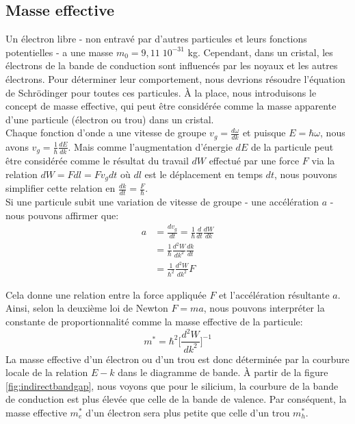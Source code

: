 \subsection{Masse effective}
Un électron libre - non entravé par d'autres particules et leurs fonctions potentielles - a une masse $m_0 = 9,11 \; 10^{-31}$ kg. Cependant, dans un cristal, les électrons de la bande de conduction sont influencés par les noyaux et les autres électrons. Pour déterminer leur comportement, nous devrions résoudre l'équation de Schrödinger pour toutes ces particules. À la place, nous introduisons le concept de masse effective, qui peut être considérée comme la masse apparente d'une particule (électron ou trou) dans un cristal.\\
Chaque fonction d'onde a une vitesse de groupe $v_g = \frac{d \omega}{dk}$ et puisque $E = \hbar \omega$, nous avons $v_g = \frac{1}{\hbar}\frac{dE}{dk}$. Mais comme l'augmentation d'énergie $dE$ de la particule peut être considérée comme le résultat du travail $dW$ effectué par une force $F$ via la relation $dW = F dl = F v_g dt$ où $dl$ est le déplacement en temps $dt$, nous pouvons simplifier cette relation en $\frac{dk}{dt} = \frac{F}{\hbar}$.\\
Si une particule subit une variation de vitesse de groupe - une accélération $a$ - nous pouvons affirmer que:
\begin{equation} \label{eq1}
\begin{split}
a &= \frac{dv_g}{dt} = \frac{1}{\hbar}\frac{d}{dt}\frac{dW}{dk} \\
  &= \frac{1}{\hbar}\frac{d^2 W}{dk^2}\frac{dk}{dt} \\
  &= \frac{1}{\hbar^2}\frac{d^2 W}{dk^2}F
\end{split}
\end{equation}

Cela donne une relation entre la force appliquée $F$ et l'accélération résultante $a$. Ainsi, selon la deuxième loi de Newton $F = ma$, nous pouvons interpréter la constante de proportionnalité comme la masse effective de la particule:
$$
m^* = \hbar^2 \Big[\frac{d^2 W}{dk^2}\Big]^{-1}
$$
La masse effective d'un électron ou d'un trou est donc déterminée par la courbure locale de la relation $E-k$ dans le diagramme de bande. À partir de la figure \ref{fig:indirectbandgap}, nous voyons que pour le silicium, la courbure de la bande de conduction est plus élevée que celle de la bande de valence. Par conséquent, la masse effective $m_e^*$ d'un électron sera plus petite que celle d'un trou $m_h^*$.

